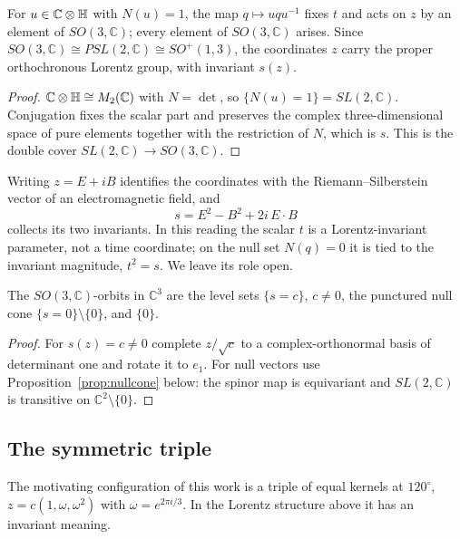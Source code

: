 \begin{proposition}\label{prop:readingB}
For \(u\in\mathbb C\otimes\mathbb H\) with \(N(u)=1\), the map \(q\mapsto uqu^{-1}\) fixes \(t\) and acts on \(z\) by an element of \(SO(3,\mathbb C)\);
every element of \(SO(3,\mathbb C)\) arises.  Since \(SO(3,\mathbb C)\cong PSL(2,\mathbb C)\cong SO^+(1,3)\), the coordinates \(z\) carry the
proper orthochronous Lorentz group, with invariant \(s(z)\).
\end{proposition}

\begin{proof}
\(\mathbb C\otimes\mathbb H\cong M_2(\mathbb C)\) with \(N=\det\), so \(\{N(u)=1\}=SL(2,\mathbb C)\).  Conjugation fixes the scalar part and preserves
the complex three-dimensional space of pure elements together with the restriction of \(N\), which is \(s\).  This is the double cover
\(SL(2,\mathbb C)\to SO(3,\mathbb C)\).
\end{proof}

Writing \(z=E+iB\) identifies the coordinates with the Riemann--Silberstein vector of an electromagnetic field, and
\begin{equation}\label{eq:invariants}
s=E^2-B^2+2i\,E\cdot B
\end{equation}
collects its two invariants.  In this reading the scalar \(t\) is a Lorentz-invariant parameter, not a time coordinate; on the null set
\(N(q)=0\) it is tied to the invariant magnitude, \(t^2=s\).  We leave its role open.

\begin{proposition}[Orbits]\label{prop:orbits}
The \(SO(3,\mathbb C)\)-orbits in \(\mathbb C^3\) are the level sets \(\{s=c\}\), \(c\neq0\), the punctured null cone
\(\{s=0\}\setminus\{0\}\), and \(\{0\}\).
\end{proposition}

\begin{proof}
For \(s(z)=c\neq0\) complete \(z/\sqrt c\) to a complex-orthonormal basis of determinant one and rotate it to \(e_1\).  For null vectors use
Proposition~\ref{prop:nullcone} below: the spinor map is equivariant and \(SL(2,\mathbb C)\) is transitive on \(\mathbb C^2\setminus\{0\}\).
\end{proof}

\subsection{The symmetric triple}

The motivating configuration of this work is a triple of equal kernels at \(120^\circ\), \(z=c(1,\omega,\omega^2)\) with
\(\omega=e^{2\pi i/3}\).  In the Lorentz structure above it has an invariant meaning.

